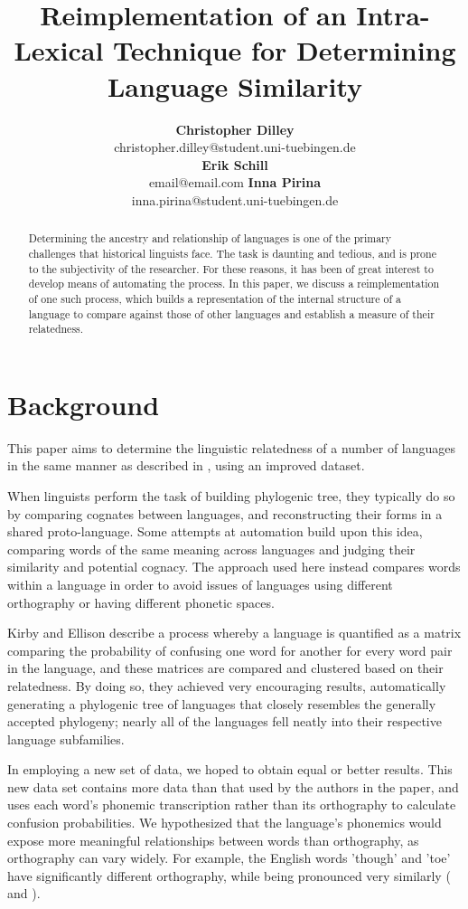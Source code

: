 \documentclass[10pt,a4]{article}
\title{Reimplementation of an Intra-Lexical Technique for Determining Language Similarity}
\author{{\large \bf Christopher Dilley} \\
	 christopher.dilley@student.uni-tuebingen.de \\\And
	{\large \bf Erik Schill} \\
	email@email.com \And
	{\large \bf Inna Pirina} \\
	inna.pirina@student.uni-tuebingen.de }
\begin{document}
\maketitle


\begin{abstract}
	
	Determining the ancestry and relationship of languages is one of the primary challenges that historical linguists face.  The task is daunting and tedious, and is prone to the subjectivity of the researcher.  For these reasons, it has been of great interest to develop means of automating the process.  In this paper, we discuss a reimplementation of one such process, which builds a representation of the internal structure of a language to compare against those of other languages and establish a measure of their relatedness.
	
\end{abstract}


\section{Background}

This paper aims to determine the linguistic relatedness of a number of languages in the same manner as described in , using an improved dataset.  

When linguists perform the task of building phylogenic tree, they typically do so by comparing cognates between languages, and reconstructing their forms in a shared proto-language.  Some attempts at automation build upon this idea, comparing words of the same meaning across languages and judging their similarity and potential cognacy.  The approach used here instead compares words within a language in order to avoid issues of languages using different orthography or having different phonetic spaces.

Kirby and Ellison describe a process whereby a language is quantified as a matrix comparing the probability of confusing one word for another for every word pair in the language, and these matrices are compared and clustered based on their relatedness.  By doing so, they achieved very encouraging results, automatically generating a phylogenic tree of languages that closely resembles the generally accepted phylogeny; nearly all of the languages fell neatly into their respective language subfamilies.

In employing a new set of data, we hoped to obtain equal or better results.  This new data set contains more data than that used by the authors in the paper, and uses each word's phonemic transcription rather than its orthography to calculate confusion probabilities.  We hypothesized that the language's phonemics would expose more meaningful relationships between words than orthography, as orthography can vary widely.  For example, the English words 'though' and 'toe' have significantly different orthography, while being pronounced very similarly (\textipa{[Do:]} and \textipa{[to:]}).
\end{document}
